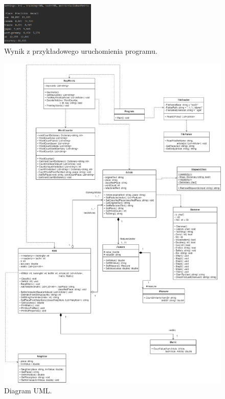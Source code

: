 \documentclass{classrep}
\begin{document}
\begin{figure}[h!]
	\centering
	\includegraphics[width=0.4\textwidth]{exampleRun.png}
	\caption{Wynik z przykładowego uruchomienia programu.}
	\label{exampleRun}
\end{figure}

\begin{figure}[h!]
	\centering
	\includegraphics[width=1\textwidth]{uml.png}
	\caption{Diagram UML.}
	\label{uml}
\end{figure}
\end{document}

